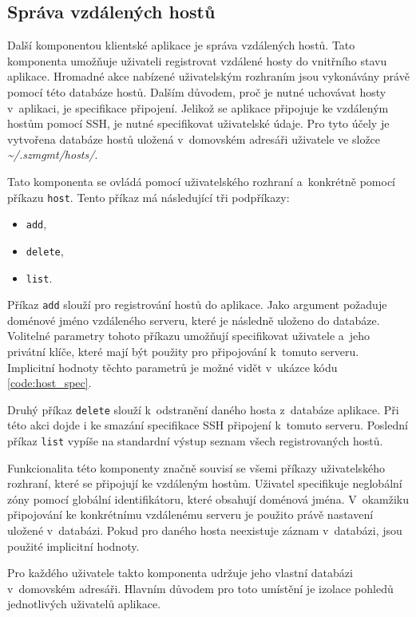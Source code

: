 \subsection{Správa vzdálených hostů}
\label{chapter:implementation:client:hosts}
Další komponentou klientské aplikace je správa vzdálených hostů. Tato komponenta umožňuje uživateli registrovat vzdálené 
hosty do vnitřního stavu aplikace. Hromadné akce nabízené uživatelským rozhraním jsou vykonávány právě pomocí této databáze
hostů. Dalším důvodem, proč je nutné uchovávat hosty v~aplikaci, je specifikace připojení. Jelikož se aplikace připojuje ke
vzdáleným hostům pomocí SSH, je nutné specifikovat uživatelské údaje. Pro tyto účely je vytvořena databáze hostů uložená
v~domovském adresáři uživatele ve složce \textit{\textasciitilde/.szmgmt/hosts/}.

Tato komponenta se ovládá pomocí uživatelského rozhraní a~konkrétně pomocí příkazu \verb|host|. Tento příkaz má následující
tři podpříkazy:
\begin{itemize}
 \item \verb|add|,
 \item \verb|delete|,
 \item \verb|list|.
\end{itemize}
Příkaz \verb|add| slouží pro registrování hostů do aplikace. Jako argument požaduje doménové jméno vzdáleného
serveru, které je následně uloženo do databáze. Volitelné parametry tohoto příkazu umožňují specifikovat uživatele a~jeho
privátní klíče, které mají být použity pro připojování k~tomuto serveru. Implicitní hodnoty těchto parametrů je možné vidět
v~ukázce kódu \ref{code:host_spec}.

Druhý příkaz \verb|delete| slouží k~odstranění daného hosta z~databáze aplikace. Při této akci dojde i ke smazání specifikace
SSH připojení k~tomuto serveru. Poslední příkaz \verb|list| vypíše na standardní výstup seznam všech registrovaných hostů.

Funkcionalita této komponenty značně souvisí se všemi příkazy uživatelského rozhraní, které se připojují ke vzdáleným hostům.
Uživatel specifikuje neglobální zóny pomocí globální identifikátoru, které obsahují doménová jména. V~okamžiku připojování
ke konkrétnímu vzdálenému serveru je použito právě nastavení uložené v~databázi. Pokud pro daného hosta neexistuje záznam
v~databázi, jsou použité implicitní hodnoty.

Pro každého uživatele takto komponenta udržuje jeho vlastní databázi v~domovském adresáři. Hlavním důvodem pro toto umístění
je izolace pohledů jednotlivých uživatelů aplikace.
